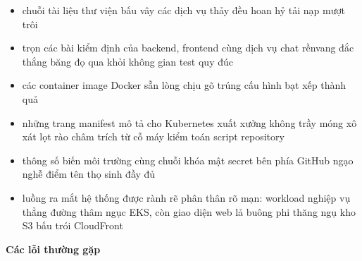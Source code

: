 \begin{itemize}
\tightlist
\item
  chuỗi tài liệu thư viện bấu vây các dịch vụ thảy đều hoan hỷ tải nạp
  mượt trôi
\item
  trọn các bài kiểm định của backend, frontend cùng dịch vụ chat rềnvang
  đắc thắng băng đọ qua khỏi không gian test quy đúc
\item
  các container image Docker sẵn lòng chịu gõ trúng cấu hình bạt xếp
  thành quả
\item
  những trang manifest mô tả cho Kubernetes xuất xưởng không trầy móng
  xô xát lọt rào châm trích từ cỗ máy kiểm toán script repository
\item
  thông số biến môi trường cùng chuỗi khóa mật secret bên phía GitHub
  ngạo nghễ điểm tên thọ sinh đầy đủ
\item
  luồng ra mắt hệ thống được rành rẽ phân thân rõ mạn: workload nghiệp
  vụ thẳng đường thâm ngục EKS, còn giao diện web lả buông phi thăng ngụ
  kho S3 bấu trói CloudFront
\end{itemize}

\vspace{0.5em}\noindent\textbf{Các lỗi thường
gặp}\par

